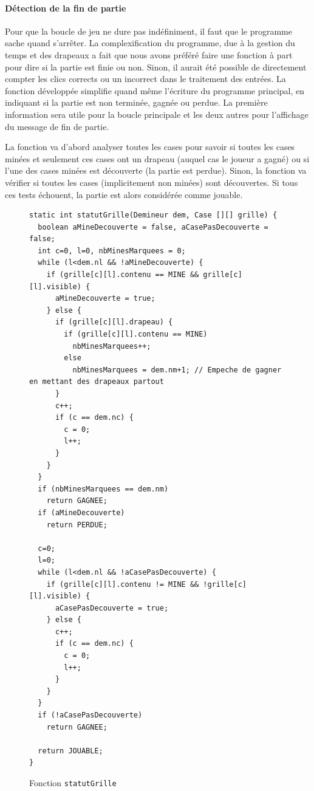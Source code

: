 \documentclass[a4paper, 12pt, oneside]{article}
\newcommand{\var}[1]{\texttt{#1}}
\begin{document}
\paragraph{Détection de la fin de partie} Pour que la boucle de jeu ne dure pas indéfiniment, il faut que le programme sache quand s'arrêter. La complexification du programme, due à la gestion du temps et des drapeaux a fait que nous avons préféré faire une fonction à part pour dire si la partie est finie ou non. Sinon, il aurait été possible de directement compter les clics corrects ou un incorrect dans le traitement des entrées. La fonction développée simplifie quand même l'écriture du programme principal, en indiquant si la partie est non terminée, gagnée ou perdue. La première information sera utile pour la boucle principale et les deux autres pour l'affichage du message de fin de partie.

La fonction va d'abord analyser toutes les cases pour savoir si toutes les cases minées et seulement ces cases ont un drapeau (auquel cas le joueur a gagné) ou si l'une des cases minées est découverte (la partie est perdue). Sinon, la fonction va vérifier si toutes les cases (implicitement non minées) sont découvertes. Si tous ces tests échouent, la partie est alors considérée comme jouable.
\begin{figure}[hpt]
	\center
	\caption{\label{fig:fnStatut} Fonction \var{statutGrille}}
\begin{lstlisting}
static int statutGrille(Demineur dem, Case [][] grille) {
  boolean aMineDecouverte = false, aCasePasDecouverte = false;
  int c=0, l=0, nbMinesMarquees = 0;
  while (l<dem.nl && !aMineDecouverte) {
    if (grille[c][l].contenu == MINE && grille[c][l].visible) {
      aMineDecouverte = true;
    } else {
      if (grille[c][l].drapeau) {
        if (grille[c][l].contenu == MINE)
          nbMinesMarquees++;
        else
          nbMinesMarquees = dem.nm+1; // Empeche de gagner en mettant des drapeaux partout
      }
      c++;
      if (c == dem.nc) {
        c = 0;
        l++;
      }
    }
  }
  if (nbMinesMarquees == dem.nm)
    return GAGNEE;
  if (aMineDecouverte)
    return PERDUE;
  
  c=0;
  l=0;
  while (l<dem.nl && !aCasePasDecouverte) {
    if (grille[c][l].contenu != MINE && !grille[c][l].visible) {
      aCasePasDecouverte = true;
    } else {
      c++;
      if (c == dem.nc) {
        c = 0;
        l++;
      }
    }
  }
  if (!aCasePasDecouverte)
    return GAGNEE;
  
  return JOUABLE;
}
\end{lstlisting}
\end{figure}
\end{document}
